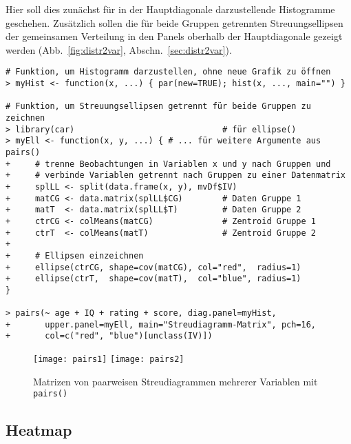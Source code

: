 Hier soll dies zunächst für in der Hauptdiagonale darzustellende Histogramme geschehen. Zusätzlich sollen die für beide Gruppen getrennten Streuungsellipsen der gemeinsamen Verteilung in den Panels oberhalb der Hauptdiagonale gezeigt werden (Abb.\ \ref{fig:distr2var}, Abschn.\ \ref{sec:distr2var}).
\begin{lstlisting}
# Funktion, um Histogramm darzustellen, ohne neue Grafik zu öffnen
> myHist <- function(x, ...) { par(new=TRUE); hist(x, ..., main="") }

# Funktion, um Streuungsellipsen getrennt für beide Gruppen zu zeichnen
> library(car)                              # für ellipse()
> myEll <- function(x, y, ...) { # ... für weitere Argumente aus pairs()
+     # trenne Beobachtungen in Variablen x und y nach Gruppen und
+     # verbinde Variablen getrennt nach Gruppen zu einer Datenmatrix
+     splLL <- split(data.frame(x, y), mvDf$IV)
+     matCG <- data.matrix(splLL$CG)        # Daten Gruppe 1
+     matT  <- data.matrix(splLL$T)         # Daten Gruppe 2
+     ctrCG <- colMeans(matCG)              # Zentroid Gruppe 1
+     ctrT  <- colMeans(matT)               # Zentroid Gruppe 2
+
+     # Ellipsen einzeichnen
+     ellipse(ctrCG, shape=cov(matCG), col="red",  radius=1)
+     ellipse(ctrT,  shape=cov(matT),  col="blue", radius=1)
}

> pairs(~ age + IQ + rating + score, diag.panel=myHist,
+       upper.panel=myEll, main="Streudiagramm-Matrix", pch=16,
+       col=c("red", "blue")[unclass(IV)])
\end{lstlisting}

\begin{figure}[ht]
\centering
\texttt{[image: pairs1]}
\texttt{[image: pairs2]}
\vspace*{-1em}
\caption{Matrizen von paarweisen Streudiagrammen mehrerer Variablen mit \lstinline!pairs()!}
\label{fig:pairs}
\end{figure}

\subsection{Heatmap}
\label{sec:heatmap}

